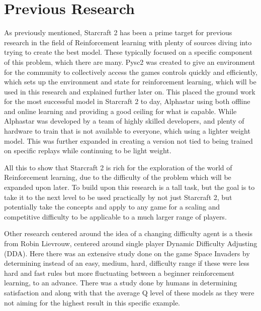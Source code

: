 \section{Previous Research}
\label{sec:Previous Research}
As previously mentioned, Starcraft 2 has been a prime target for previous research in the field of Reinforcement learning with plenty of sources diving into trying to create the best model\cite{starcraft_unplugged}\cite{liu2021mAS}\cite{liu2021mASreport}\cite{vinyals2017starcraft}.
These typically focused on a specific component of this problem, which there are many. Pysc2 was created to give an environment for the community to collectively access the games controls quickly and efficiently, which sets up the environment and state for 
reinforcement learning\cite{vinyals2017starcraft}, which will be used in this research and explained further later on. This placed the ground work for the most successful model in Starcraft 2 to day, Alphastar\cite{starcraft_unplugged} using both offline and
online learning and providing a good ceiling for what is capable. While Alphastar was developed by a team of highly skilled developers, and plenty of hardware to train that is not available to everyone, which using a lighter weight model\cite{liu2021mASreport}.
This was further expanded in creating a version not tied to being trained on specific replays while continuing to be light weight\cite{Liu2022OnER}. 

All this to show that Starcraft 2 is rich for the exploration of the world of Reinforcement learning, due to the difficulty of the problem which will be expanded upon later. To build upon this research is a tall task, but the goal is to take it to the next level
to be used practically by not just Starcraft 2, but potentially take the concepts and apply to any game for a scaling and competitive difficulty to be applicable to a much larger range of players. 

Other research centered around the idea of a changing difficulty agent is a thesis from Robin Lievrouw, centered around single player Dynamic Difficulty Adjusting (DDA)\cite{lievrouw_applying_2020}. Here there was an extensive study done on the game Space Invaders by 
determining instead of an easy, medium, hard, difficulty range if these were less hard and fast rules but more fluctuating between a beginner reinforcement learning, to an advance. There was a study done by humans in determining satisfaction and along with that
the average Q level of these models as they were not aiming for the highest result in this specific example. 

